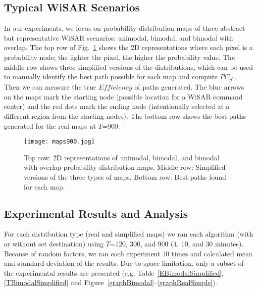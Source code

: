 \subsection{Typical WiSAR Scenarios}

In our experiments, we focus on probability distribution maps of three abstract but representative WiSAR scenarios: unimodal, bimodal, and bimodal with overlap. The top row of Fig.~\ref{maps} shows the 2D representations where each pixel is a probability node; the lighter the pixel, the higher the probability value. The middle row shows three simplified versions of the distributions, which can be used to manually identify the best path possible for each map and compute $PC_{p^*}$. Then we can measure the true $\mathit{Efficiency}$ of paths generated. The blue arrows on the maps mark the starting node (possible location for a WiSAR command center) and the red dots mark the ending node (intentionally selected at a different region from the starting nodes). The bottom row shows the best paths generated for the real maps at $T$=900.

\begin{figure}
\centering
\texttt{[image: maps900.jpg]}
\caption{Top row: 2D representations of unimodal, bimodal, and bimodal with overlap probability distribution maps. Middle row: Simplified versions of the three types of maps. Bottom row: Best paths found for each map.}
\label{maps}
\end{figure}


\subsection{Experimental Results and Analysis}

For each distribution type (real and simplified maps) we ran each algorithm (with or without set destination) using $T$=120, 300, and 900 (4, 10, and 30 minutes). Because of random factors, we ran each experiment 10 times and calculated mean and standard deviation of the results. Due to space limitation, only a subset of the experimental results are presented (e.g. Table~\ref{EBimodalSimplified}, \ref{TBimodalSimplified} and Figure~\ref{graphBimodal}--\ref{graphRealSimple}).

